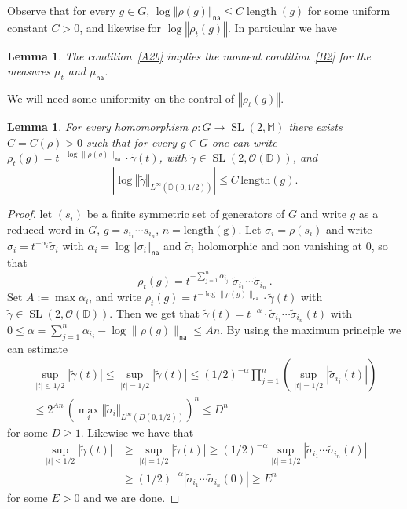\documentclass[10pt]{amsart}
\newtheorem{lemm}[theo]{Lemma}\newtheorem{prop}[theo]{Proposition}\newtheorem{coro}[theo]{Corollary}\newtheorem{conj}[theo]{Conjecture}
\theoremstyle{definition}\newtheorem{defi}[theo]{Definition}\newtheorem{rema}[theo]{Remark}\newtheorem{exam}[theo]{Example}\newtheorem{exem}[theo]{Example}\newtheorem{nota}[theo]{Notation}
\DeclareMathOperator{\length}{length}
\DeclareMathOperator{\SL}{SL}
\newcommand{\cO}{\mathcal{O}}
\newcommand{\mm}{\mathbb{M}}
\newcommand{\D}{\mathbb{D}}
\newcommand{\norm}[1]{\left\Vert#1\right\Vert}
\newcommand{\abs}[1]{\left\vert#1\right\vert}
\newcommand{\lrpar}[1]{\left(#1\right)}
\newcommand{\na}{\mathsf{na}}
\begin{document}
Observe that for every $g\in G$, $\log \norm{\rho(g)}_\na\leq C \length (g)$ for some uniform constant $C>0$, and likewise for $\log\norm{\rho_t(g)}$. In particular we have

\begin{lemm}\label{lem:AtoB}
The condition~\eqref{A2b} implies the moment condition~\eqref{B2} for the measures $\mu_t$ and $\mu_\na$.
\end{lemm}

We will need some uniformity on the control of $\norm{\rho_t(g)}$.

\begin{lemm}\label{lem:uniform disk}
For every homomorphism $\rho: G\to \SL(2, \mm)$ there exists $C = C(\rho)>0$ such that for every $g\in G$ one can write $\rho_t(g) = t^{-\log\|\rho(g) \|_\na}\cdot \widetilde{\gamma}(t)$, with $\widetilde{\gamma}\in \SL(2,\cO(\D))$, and
\begin{equation}\label{eq:uniform disk}
\abs{\log\norm{\widetilde \gamma}_{L^{\infty}(\overline{\D}(0,1/2))} }\leq C\, \mathrm{length}(g).
\end{equation}
\end{lemm}

\begin{proof}
let $(s_i)$ be a finite symmetric set of generators of $G$ and write $g$ as a reduced word in $G$, $g = s_{i_1}\cdots s_{i_n}$, $n = \mathrm{length(g)}$. Let $\sigma_i = \rho(s_i)$ and write $\sigma_i = t^{-\alpha_i} \widetilde \sigma_i$ with $\alpha_i = \log\norm{\sigma_i}_\na$ and $\widetilde \sigma_i$ holomorphic and non vanishing at 0,
so that
\[
\rho_t(g)= t^{-\sum_{j=1}^n\alpha_{i_j}} \; \widetilde \sigma_{i_1}\cdots \widetilde \sigma_{i_n}~.
\]
Set $A:= \max \alpha_i$, and write $\rho_t(g) = t^{-\log\|\rho(g) \|_\na}\cdot \widetilde{\gamma}(t)$ with $\widetilde{\gamma} \in \SL(2, \cO(\D))$. Then we get that $\widetilde{\gamma}(t) = t^{-\alpha} \cdot \widetilde \sigma_{i_1}\cdots \widetilde \sigma_{i_n}(t)$ with $0\le \alpha = \sum_{j=1}^n\alpha_{i_j} - \log\|\rho(g) \|_\na \le An$. By using the maximum principle we can estimate
\begin{multline*}
\sup_{|t|\le1/2}|\widetilde{\gamma}(t)| \le \sup_{|t|=1/2} |\widetilde{\gamma}(t)| \le (1/2)^{-\alpha} \prod_{j=1}^n \lrpar {\sup_{|t|=1/2} \abs{\widetilde \sigma_{i_j}(t) }}\\
\le 2^{An} \, \left(\max_{i}\norm{ \widetilde \sigma_i}_{L^\infty(D(0, 1/2))} \right)^n\le D^n
\end{multline*}
for some $D\geq1$. Likewise we have that
\begin{align*}
\sup_{|t|\le1/2}|\widetilde{\gamma}(t)| &\ge \sup_{|t|=1/2} |\widetilde{\gamma}(t)|
\ge (1/2)^{-\alpha} \sup_{|t|=1/2} \abs{\widetilde \sigma_{i_1}\cdots \widetilde \sigma_{i_n}(t)}\\
&\ge (1/2)^{-\alpha} \abs{\widetilde \sigma_{i_1}\cdots \widetilde \sigma_{i_n}(0)} \ge E^n
\end{align*}
for some $E>0$ and we are done.
\end{proof}
\end{document}
